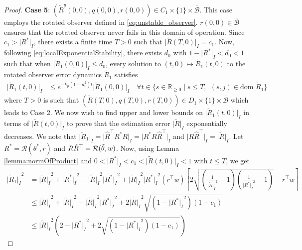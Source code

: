 \documentclass{article}
\newcommand{\dom}{\text{dom }}
\newcommand{\R}[1]{\mathbb{R}^{#1}}
\newcommand{\brackets}[1]{\left(#1\right)}
\newcommand{\Rtilde}{\tilde{R}}
\newcommand{\normSOthree}[1]{{{\vert}#1 {\vert}_I}}
\newcommand{\expo}[1]{e^{#1}}
\newcommand{\Rstar}{{R^*}}
\begin{document}
\begin{proof}
\textbf{Case 5}: ${(\Rtilde^y(0,0), q(0,0), r(0,0))}\in C_1\times\{1\}\times \overline{\mathcal{B}}$. This case employs the rotated observer defined in \eqref{eq:unstable_observer}. $r(0,0)\in \overline{\mathcal{B}}$ ensures that the rotated observer never fails in this domain of operation. Since $c_1 > \normSOthree{\Rstar}$, there exists a finite time $T>0$ such that $\normSOthree{\Rtilde(T,0)} = c_1$. Now, following \eqref{eq:localExponentialStability}, there exists $d_0$ with $1 - \normSOthree{\Rstar} < d_0 < 1$ such that when $\normSOthree{\Rtilde_1(0,0)}\leq d_0$, every solution to $(t,0)\mapsto \Rtilde_1(t,0)$ to the rotated observer error dynamics $\Rtilde_1$ satisfies
\begin{align}\label{eq:R1tilde_exponentialconvergence}
    \normSOthree{\Rtilde_1(t,0)} &\leq \expo{-\overline{k_p}(1-d_0^2)t}\normSOthree{\Rtilde_1(0,0)} \quad \forall t \in \{s\in \R{}_{\geq 0}\mid s \leq T,\:\: (s,j)\in \dom\Rtilde_1\}
\end{align}
where $T > 0$ is such that $(\Rtilde(T,0), q(T,0), r(T,0))\in D_1\times \{1\}\times \overline{\mathcal{B}}$ which leads to Case 2. We now wish to find upper and lower bounds on $\normSOthree{\Rtilde_1(t,0)}$ in terms of $\normSOthree{\Rtilde(t,0)}$ to prove that the estimation error $\normSOthree{\Rtilde}$ exponentially decreases. We note that $\normSOthree{\Rtilde_1} = \normSOthree{\hat{R}^\top \Rstar R} = \normSOthree{\Rstar R\hat{R}^\top }$ and $\normSOthree{R\hat{R}^\top } = \normSOthree{\Rtilde}$. Let $\Rstar = \mathcal{R}(\theta^*, r)$ and $R\hat{R}^\top  = \mathcal{R}(\Tilde{\theta}, w)$. Now, using Lemma \ref{lemma:normOfProduct} and $0 < \normSOthree{\Rstar} < c_1 < \normSOthree{\Rtilde(t,0)} < 1$ with $t\leq T$,
we get 
\begin{align}
    \normSOthree{\Rtilde_1}^2 &= \normSOthree{\Rtilde}^2 + \normSOthree{\Rstar}^2 - \normSOthree{\Rtilde}^2\normSOthree{\Rstar}^2 + \normSOthree{\Rtilde}^2\normSOthree{\Rstar}^2(r^\top w)\left[2\sqrt{\brackets{\frac{1}{\normSOthree{\Rtilde}^2}-1}\brackets{\frac{1}{\normSOthree{\Rstar}^2}-1}} - r^\top w\right]\nonumber\\
    &\leq \normSOthree{\Rtilde}^2 + \normSOthree{\Rtilde}^2 - \normSOthree{\Rtilde}^2\normSOthree{\Rstar}^2 + 2\normSOthree{\Rtilde}^2\sqrt{(1 - \normSOthree{\Rstar}^2)(1 - c_1)}\nonumber\\
    &\leq \normSOthree{\Rtilde}^2\brackets{2 - \normSOthree{\Rstar}^2 + 2\sqrt{(1-\normSOthree{\Rstar}^2)(1-c_1)}} \label{eq:R1tilde_upperbound}

\end{align}
\end{proof}
\end{document}

